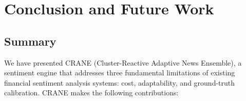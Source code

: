 \section{Conclusion and Future Work}
\label{sec:conclusion}

\subsection{Summary}

We have presented CRANE (Cluster-Reactive Adaptive News Ensemble), a sentiment engine that addresses three fundamental limitations of existing financial sentiment analysis systems: cost, adaptability, and ground-truth calibration. CRANE makes the following contributions:


